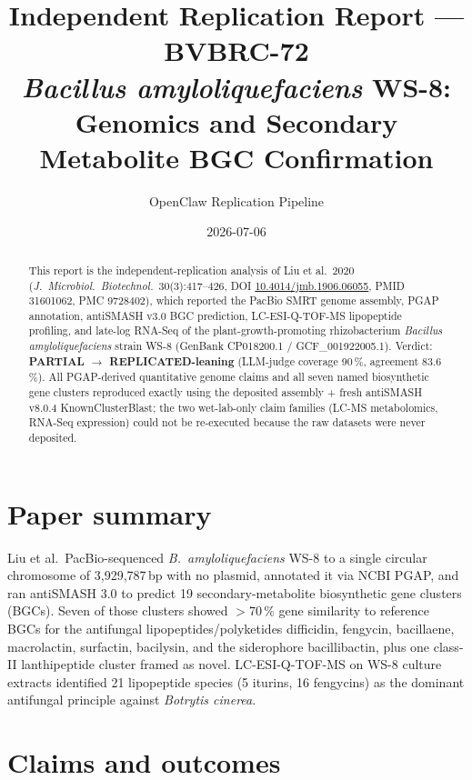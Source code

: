 \documentclass[11pt]{article}
\title{Independent Replication Report --- BVBRC-72\\
\textit{Bacillus amyloliquefaciens} WS-8: Genomics and Secondary Metabolite BGC Confirmation}
\author{OpenClaw Replication Pipeline}
\date{2026-07-06}
\begin{document}
\maketitle

\begin{abstract}
This report is the independent-replication analysis of Liu et al.\ 2020 (\textit{J.\ Microbiol.\ Biotechnol.}\ 30(3):417--426, DOI \href{https://doi.org/10.4014/jmb.1906.06055}{10.4014/jmb.1906.06055}, PMID 31601062, PMC 9728402), which reported the PacBio SMRT genome assembly, PGAP annotation, antiSMASH v3.0 BGC prediction, LC-ESI-Q-TOF-MS lipopeptide profiling, and late-log RNA-Seq of the plant-growth-promoting rhizobacterium \textit{Bacillus amyloliquefaciens} strain WS-8 (GenBank CP018200.1 / GCF\_001922005.1). Verdict: \textbf{PARTIAL $\rightarrow$ REPLICATED-leaning} (LLM-judge coverage 90\,\%, agreement 83.6\,\%). All PGAP-derived quantitative genome claims and all seven named biosynthetic gene clusters reproduced exactly using the deposited assembly + fresh antiSMASH v8.0.4 KnownClusterBlast; the two wet-lab-only claim families (LC-MS metabolomics, RNA-Seq expression) could not be re-executed because the raw datasets were never deposited.
\end{abstract}

\section{Paper summary}
Liu et al.\ PacBio-sequenced \textit{B.\ amyloliquefaciens} WS-8 to a single circular chromosome of 3{,}929{,}787\,bp with no plasmid, annotated it via NCBI PGAP, and ran antiSMASH 3.0 to predict 19 secondary-metabolite biosynthetic gene clusters (BGCs). Seven of those clusters showed $>$70\,\% gene similarity to reference BGCs for the antifungal lipopeptides/polyketides difficidin, fengycin, bacillaene, macrolactin, surfactin, bacilysin, and the siderophore bacillibactin, plus one class-II lanthipeptide cluster framed as novel. LC-ESI-Q-TOF-MS on WS-8 culture extracts identified 21 lipopeptide species (5 iturins, 16 fengycins) as the dominant antifungal principle against \textit{Botrytis cinerea}.

\section{Claims and outcomes}
\end{document}
